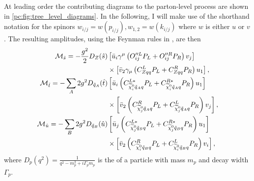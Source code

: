 \documentclass[../main.tex]{subfiles}
\begin{document}
At leading order the contributing diagrams to the parton-level process are
shown in \cref{pc:fig:tree_level_diagrams}. In the following, I will make use
of the shorthand notation for the spinors \(w_{i/j} = w(p_{i/j}), w_{1,2} =
w(k_{i/j})\) where \(w\) is either \(u\) or \(v\). The resulting amplitudes,
using the Feynman rules in , are then
\begin{subequations}
	\begin{align}
		\nonumber
		\M_{\hat{s}} = -\frac{g^2}{2} D_Z(\hat{s})           & \bclosed{ \bar{u}_i\gamma^\mu\pclosed{O^{\prime\prime L}_{ij}P_L + O^{\prime\prime R}_{ij}P_R} v_j }           \\
		                                                     & \times \bclosed{ \bar{v}_2 \gamma_\mu \pclosed{C^L_{Zqq}P_L + C^R_{Zqq}P_R} u_1 },                             \\
		\nonumber
		\M_{\hat{t}} = -\sum_A 2g^2 D_{\tilde{q}_A}(\hat{t}) & \bclosed{ \bar{u}_i \pclosed{C_{\nino[i]\tilde{q}_Aq}^{L\ast}P_L + C_{\nino[i]\tilde{q}_Aq}^{R\ast} P_R} u_1 } \\
		                                                     & \times \bclosed{ \bar{v}_2 \pclosed{C^R_{\nino[j]\tilde{q}_Aq}P_L + C^L_{\nino[j]\tilde{q}_Aq}P_R} v_j },      \\
		\nonumber
		\M_{\hat{u}} = -\sum_B 2g^2 D_{\tilde{q}_B}(\hat{u}) & \bclosed{ \bar{u}_j \pclosed{C_{\nino[j]\tilde{q}_Bq}^{L\ast}P_L + C_{\nino[j]\tilde{q}_Bq}^{R\ast} P_R} u_1 } \\
		                                                     & \times \bclosed{ \bar{v}_2 \pclosed{C^R_{\nino[i]\tilde{q}_Bq}P_L + C^L_{\nino[i]\tilde{q}_Bq}P_R} v_i },
	\end{align}
\end{subequations}
where \(D_p(q^2) = \frac{1}{q^2 - m_p^2 + i\Gamma_p m_p}\) is the  of a particle with mass \(m_p\) and decay width \(\Gamma_p\).
\end{document}
